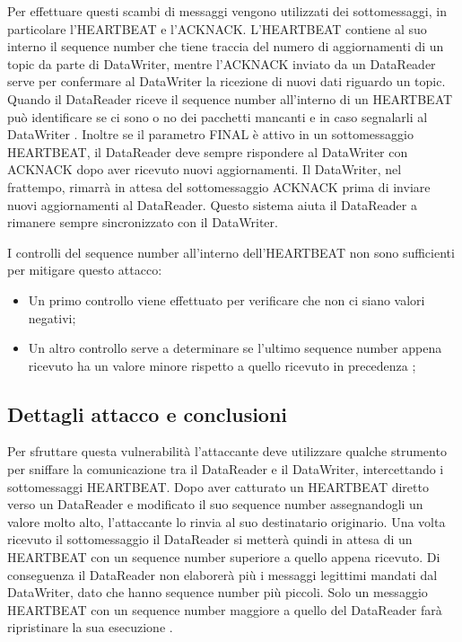 Per effettuare questi scambi di messaggi vengono utilizzati dei sottomessaggi,
in particolare l'HEARTBEAT e l'ACKNACK.
L'HEARTBEAT contiene al suo interno il sequence number che tiene traccia 
del numero di aggiornamenti di un topic da parte di DataWriter, mentre
l'ACKNACK inviato da un DataReader
serve per confermare al DataWriter la ricezione di nuovi dati 
riguardo un topic.
Quando il DataReader riceve il sequence number all'interno di un HEARTBEAT
può identificare se ci sono o no dei pacchetti mancanti e in caso segnalarli al
DataWriter \cite{White2017AnII}.
Inoltre se il parametro FINAL è attivo in un sottomessaggio HEARTBEAT, il DataReader 
deve sempre rispondere al DataWriter con ACKNACK dopo aver ricevuto nuovi aggiornamenti.
Il DataWriter, nel frattempo, rimarrà in attesa del sottomessaggio 
ACKNACK prima di 
inviare nuovi aggiornamenti al DataReader.
Questo sistema aiuta il DataReader a rimanere sempre sincronizzato con il 
DataWriter.

I controlli del sequence number all'interno dell'HEARTBEAT 
non sono sufficienti per mitigare questo attacco:
\begin{itemize}
    \item Un primo controllo viene effettuato per verificare che non ci siano 
    valori negativi;
    \item Un altro controllo serve a determinare se l'ultimo sequence number
    appena ricevuto ha un valore minore rispetto a quello ricevuto in precedenza
    \cite{White2017AnII};
\end{itemize}


\subsection{Dettagli attacco e conclusioni}

Per sfruttare questa vulnerabilità l'attaccante deve utilizzare qualche 
strumento per sniffare la comunicazione tra il DataReader e il DataWriter,
intercettando i
sottomessaggi HEARTBEAT. Dopo aver catturato un HEARTBEAT diretto verso 
un DataReader e modificato 
il suo sequence number assegnandogli un valore molto alto, 
l'attaccante lo rinvia al suo destinatario originario.
Una volta ricevuto il sottomessaggio il DataReader si metterà quindi 
in attesa di un HEARTBEAT con un sequence number 
superiore a quello appena ricevuto. Di conseguenza il DataReader
non elaborerà più i messaggi legittimi mandati dal DataWriter,
dato che hanno sequence number più piccoli.
Solo un messaggio HEARTBEAT con un sequence number
maggiore a quello del DataReader farà ripristinare la sua esecuzione 
\cite{White2017AnII}.


